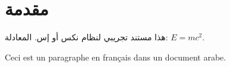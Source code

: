 \documentclass{article}
\begin{document}
\section{مقدمة}
هذا مستند تجريبي لنظام نكس أو إس. المعادلة: $E=mc^2$.
\begin{french}Ceci est un paragraphe en français dans un document arabe.\end{french}
\end{document}
